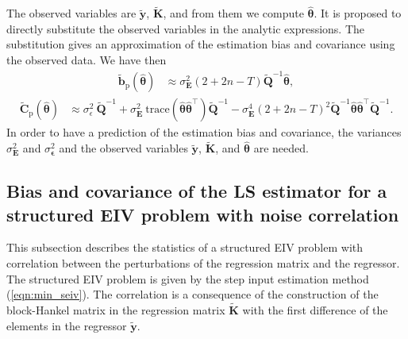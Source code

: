 The observed variables are $\widetilde{\mathbf{y}}$, $\widetilde{\mathbf{K}}$, and from them we compute $\widehat{\bm{\theta}}$.
It is proposed to directly substitute the observed variables in the analytic expressions.
The substitution gives an approximation of the estimation bias and covariance using the observed data.
We have then
\begin{equation} \begin{aligned} \widetilde{\mathbf{b}}_{\mathrm{p}} \left( \widehat{\bm{\theta}} \right) & \approx \sigma_{\mathbf{E}}^2 \left( 2 + 2n - T \right) \widetilde{\mathbf{Q}}^{-1} \widehat{\bm{\theta}} , \end{aligned} \label{eqn:biasEuST} \end{equation}
\begin{equation} \begin{aligned} \widetilde{\mathbf{C}}_{\mathrm{p}} \left( \widehat{\bm{\theta}} \right) & \approx \sigma_\epsilon^2 \ \widetilde{\mathbf{Q}}^{-1} + \sigma_{\mathbf{E}}^2 \ \mathrm{trace} \left( \widehat{\bm{\theta}} \widehat{\bm{\theta}}^\top \right) \widetilde{\mathbf{Q}}^{-1} - \sigma_{\mathbf{E}}^4 \left( 2 + 2n - T \right)^2 \widetilde{\mathbf{Q}}^{-1} \widehat{\bm{\theta}} \widehat{\bm{\theta}}^\top \widetilde{\mathbf{Q}}^{-1} . \end{aligned} \label{eqn:varEuST} \end{equation}
In order to have a prediction of the estimation bias and covariance, the variances $\sigma_{\mathbf{E}}^2$ and $\sigma_{\bm{\epsilon}}^2$ and the observed variables $\widetilde{\mathbf{y}}$, $\widetilde{\mathbf{K}}$, and $\widehat{\bm{\theta}}$ are needed.


\subsection{Bias and covariance of the LS estimator for a structured EIV problem with noise correlation}

This subsection describes the statistics of a structured EIV problem with correlation between the perturbations of the regression matrix and the regressor. 
The structured EIV problem is given by the step input estimation method (\ref{eqn:min_seiv}).
The correlation is a consequence of the construction of the block-Hankel matrix in the regression matrix $\widetilde{\mathbf{K}}$ with the first difference of the elements in the regressor $\widetilde{\mathbf{y}}$.

